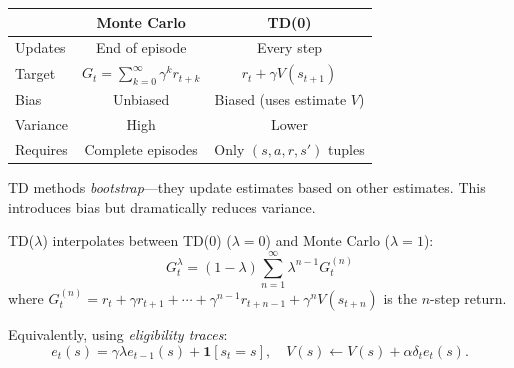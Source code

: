 \begin{remark}
    \begin{center}
        \begin{tabular}{l|cc}
                     & \textbf{Monte Carlo}                         & \textbf{TD(0)}             \\
            \hline
            Updates  & End of episode                               & Every step                 \\
            Target   & $G_t = \sum_{k=0}^{\infty} \gamma^k r_{t+k}$ & $r_t + \gamma V(s_{t+1})$  \\
            Bias     & Unbiased                                     & Biased (uses estimate $V$) \\
            Variance & High                                         & Lower                      \\
            Requires & Complete episodes                            & Only $(s,a,r,s')$ tuples   \\
        \end{tabular}
    \end{center}
    TD methods \emph{bootstrap}---they update estimates based on other estimates. This introduces bias but dramatically reduces variance.
\end{remark}

\begin{definition}
    TD($\lambda$) interpolates between TD(0) ($\lambda=0$) and Monte Carlo ($\lambda=1$):
    \[
        G_t^\lambda = (1-\lambda) \sum_{n=1}^{\infty} \lambda^{n-1} G_t^{(n)}
    \]
    where $G_t^{(n)} = r_t + \gamma r_{t+1} + \cdots + \gamma^{n-1} r_{t+n-1} + \gamma^n V(s_{t+n})$ is the $n$-step return.

    Equivalently, using \emph{eligibility traces}:
    \[
        e_t(s) = \gamma \lambda e_{t-1}(s) + \mathbf{1}[s_t = s], \quad V(s) \leftarrow V(s) + \alpha \delta_t e_t(s).
    \]
\end{definition}

\begin{center}
\end{center}

